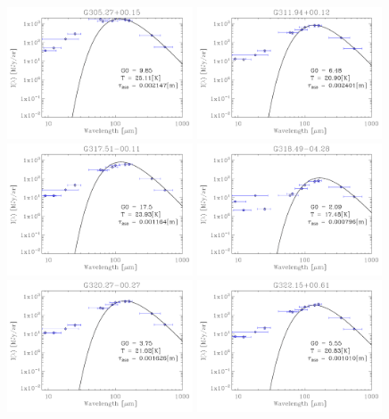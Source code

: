 \begin{figure}
\includegraphics[trim=-1mm -1mm -1mm -1mm, clip, width=55mm]{appB/appB_78.pdf}
\includegraphics[trim=-1mm -1mm -1mm -1mm, clip, width=55mm]{appB/appB_79.pdf}
\includegraphics[trim=-1mm -1mm -1mm -1mm, clip, width=55mm]{appB/appB_80.pdf}
\includegraphics[trim=-1mm -1mm -1mm -1mm, clip, width=55mm]{appB/appB_81.pdf}
\includegraphics[trim=-1mm -1mm -1mm -1mm, clip, width=55mm]{appB/appB_82.pdf}
\includegraphics[trim=-1mm -1mm -1mm -1mm, clip, width=55mm]{appB/appB_83.pdf}

\end{figure}

